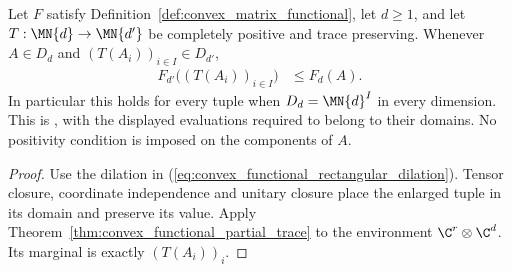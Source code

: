 \begin{theorem}
    \label{thm:convex_functional_monotonicity}
    \leanok
    Let $F$ satisfy Definition~\ref{def:convex_matrix_functional}, let
    $d\ge1$, and let $T:\MN{d}\to\MN{d'}$ be completely positive and trace
    preserving. Whenever $A\in D_d$ and $(T(A_i))_{i\in I}\in D_{d'}$,
    \begin{align}
        F_{d'}\bigl((T(A_i))_{i\in I}\bigr)&\le F_d(A).
        \label{eq:convex_functional_monotonicity}
    \end{align}
    In particular this holds for every tuple when $D_d=\MN{d}^{I}$ in
    every dimension. This is \cite[Theorem~5.16, Equation~(5.49)]{Wolf2012Quantum},
    with the displayed evaluations required to belong to their domains.
    No positivity condition is imposed on the components of $A$.
\end{theorem}
\begin{proof}
    \leanok
    Use the dilation in
    (\ref{eq:convex_functional_rectangular_dilation}). Tensor closure,
    coordinate independence and unitary closure place the enlarged tuple
    in its domain and preserve its value. Apply
    Theorem~\ref{thm:convex_functional_partial_trace} to the environment
    $\C^r\otimes\C^d$. Its marginal is exactly $(T(A_i))_i$.
\end{proof}
